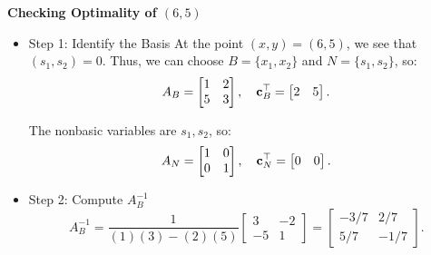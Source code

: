 \begin{solution} \textbf{Checking Optimality of \( (6,5) \)}

\begin{itemize}
\item {Step 1: Identify the Basis}
At the point $(x,y) = (6,5)$, we see that $(s_1, s_2) = 0$.  Thus, we can choose 
 \(B= \{x_1, x_2\} \) and $N = \{s_1, s_2\}$, so:
\[
A_B =
\begin{bmatrix}
    1 & 2 \\
    5 & 3
\end{bmatrix}, \quad
\mathbf{c}_B^\top =
\begin{bmatrix}
    2 & 5
\end{bmatrix}.
\]

The nonbasic variables are \( s_1, s_2 \), so:
\[
A_N =
\begin{bmatrix}
    1 & 0 \\
    0 & 1
\end{bmatrix}, \quad
\mathbf{c}_N^\top =
\begin{bmatrix}
    0 & 0
\end{bmatrix}.
\]

\item {Step 2: Compute \( A_B^{-1} \)}
\[
A_B^{-1} =
\frac{1}{(1)(3) - (2)(5)}
\begin{bmatrix}
    3 & -2 \\
    -5 & 1
\end{bmatrix}
=
\begin{bmatrix}
    -3/7 & 2/7 \\
    5/7 & -1/7
\end{bmatrix}.
\]


\end{itemize}
\end{solution}
